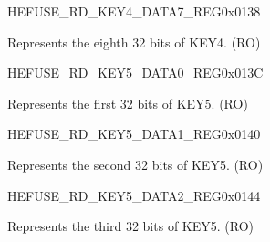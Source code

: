 \begin{register}{H}{EFUSE\_RD\_KEY4\_DATA7\_REG}{0x{}0138}\label{regdesc:EFUSERDKEY4DATA7REG}
%
\regnewline%
\begin{regdesc}\begin{reglist}
\label{fielddesc:EFUSEKEY4DATA7}\item [EFUSE\_KEY4\_DATA7] Represents the eighth 32 bits of KEY4. (RO)
\end{reglist}\end{regdesc}
\end{register}


\begin{register}{H}{EFUSE\_RD\_KEY5\_DATA0\_REG}{0x{}013C}\label{regdesc:EFUSERDKEY5DATA0REG}
%
\regnewline%
\begin{regdesc}\begin{reglist}
\label{fielddesc:EFUSEKEY5DATA0}\item [EFUSE\_KEY5\_DATA0] Represents the first 32 bits of KEY5. (RO)
\end{reglist}\end{regdesc}
\end{register}


\begin{register}{H}{EFUSE\_RD\_KEY5\_DATA1\_REG}{0x{}0140}\label{regdesc:EFUSERDKEY5DATA1REG}
%
\regnewline%
\begin{regdesc}\begin{reglist}
\label{fielddesc:EFUSEKEY5DATA1}\item [EFUSE\_KEY5\_DATA1] Represents the second 32 bits of KEY5. (RO)
\end{reglist}\end{regdesc}
\end{register}


\begin{register}{H}{EFUSE\_RD\_KEY5\_DATA2\_REG}{0x{}0144}\label{regdesc:EFUSERDKEY5DATA2REG}
%
\regnewline%
\begin{regdesc}\begin{reglist}
\label{fielddesc:EFUSEKEY5DATA2}\item [EFUSE\_KEY5\_DATA2] Represents the third 32 bits of KEY5. (RO)
\end{reglist}\end{regdesc}
\end{register}


